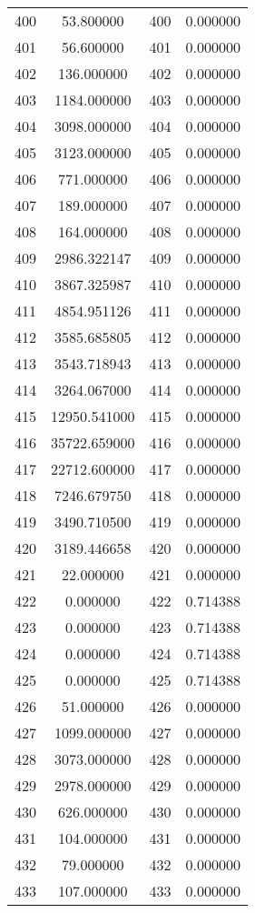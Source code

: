 \documentclass[12pt]{article}
\begin{document}
\begin{longtable}{@{}cccc@{}}
400 & 53.800000 & 400 & 0.000000 \\
401 & 56.600000 & 401 & 0.000000 \\
402 & 136.000000 & 402 & 0.000000 \\
403 & 1184.000000 & 403 & 0.000000 \\
404 & 3098.000000 & 404 & 0.000000 \\
405 & 3123.000000 & 405 & 0.000000 \\
406 & 771.000000 & 406 & 0.000000 \\
407 & 189.000000 & 407 & 0.000000 \\
408 & 164.000000 & 408 & 0.000000 \\
409 & 2986.322147 & 409 & 0.000000 \\
410 & 3867.325987 & 410 & 0.000000 \\
411 & 4854.951126 & 411 & 0.000000 \\
412 & 3585.685805 & 412 & 0.000000 \\
413 & 3543.718943 & 413 & 0.000000 \\
414 & 3264.067000 & 414 & 0.000000 \\
415 & 12950.541000 & 415 & 0.000000 \\
416 & 35722.659000 & 416 & 0.000000 \\
417 & 22712.600000 & 417 & 0.000000 \\
418 & 7246.679750 & 418 & 0.000000 \\
419 & 3490.710500 & 419 & 0.000000 \\
420 & 3189.446658 & 420 & 0.000000 \\
421 & 22.000000 & 421 & 0.000000 \\
422 & 0.000000 & 422 & 0.714388 \\
423 & 0.000000 & 423 & 0.714388 \\
424 & 0.000000 & 424 & 0.714388 \\
425 & 0.000000 & 425 & 0.714388 \\
426 & 51.000000 & 426 & 0.000000 \\
427 & 1099.000000 & 427 & 0.000000 \\
428 & 3073.000000 & 428 & 0.000000 \\
429 & 2978.000000 & 429 & 0.000000 \\
430 & 626.000000 & 430 & 0.000000 \\
431 & 104.000000 & 431 & 0.000000 \\
432 & 79.000000 & 432 & 0.000000 \\
433 & 107.000000 & 433 & 0.000000 \\

\end{longtable}
\end{document}
